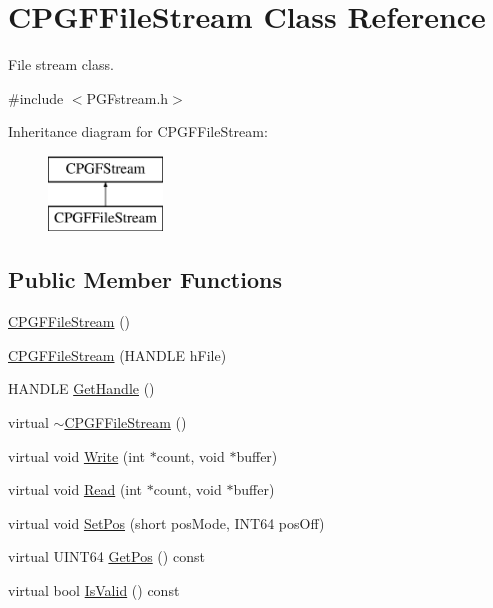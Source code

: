 \hypertarget{classCPGFFileStream}{}\section{C\+P\+G\+F\+File\+Stream Class Reference}
\label{classCPGFFileStream}


File stream class.  




{\ttfamily \#include $<$P\+G\+Fstream.\+h$>$}

Inheritance diagram for C\+P\+G\+F\+File\+Stream\+:\begin{figure}[H]
\begin{center}
\leavevmode
\includegraphics[height=2.000000cm]{classCPGFFileStream}
\end{center}
\end{figure}
\subsection*{Public Member Functions}
\begin{DoxyCompactItemize}
\item 
\mbox{\hyperlink{classCPGFFileStream_ae505bb374fe13a0b9cdac3b71ae414e2}{C\+P\+G\+F\+File\+Stream}} ()
\item 
\mbox{\hyperlink{classCPGFFileStream_ac429f9fa68a762203d727a6c0d586eec}{C\+P\+G\+F\+File\+Stream}} (H\+A\+N\+D\+LE h\+File)
\item 
H\+A\+N\+D\+LE \mbox{\hyperlink{classCPGFFileStream_a94046c82916ffeb6aa868f27f25b1c37}{Get\+Handle}} ()
\item 
virtual \mbox{\hyperlink{classCPGFFileStream_ac9da1053f6b3cb8f3e403060ff7a44ae}{$\sim$\+C\+P\+G\+F\+File\+Stream}} ()
\item 
virtual void \mbox{\hyperlink{classCPGFFileStream_a28a060662951edf72f7739ba575c9fff}{Write}} (int $\ast$count, void $\ast$buffer)
\item 
virtual void \mbox{\hyperlink{classCPGFFileStream_a3ff32003518e1d996cc8af33c5bbbfaf}{Read}} (int $\ast$count, void $\ast$buffer)
\item 
virtual void \mbox{\hyperlink{classCPGFFileStream_a2460f1fdab77a44ddf24420139a50043}{Set\+Pos}} (short pos\+Mode, I\+N\+T64 pos\+Off)
\item 
virtual U\+I\+N\+T64 \mbox{\hyperlink{classCPGFFileStream_a9ec4715342add84461c62631101e1ce6}{Get\+Pos}} () const
\item 
virtual bool \mbox{\hyperlink{classCPGFFileStream_a999b6c0ebc670ea58f5e34729e7f323a}{Is\+Valid}} () const
\end{DoxyCompactItemize}

